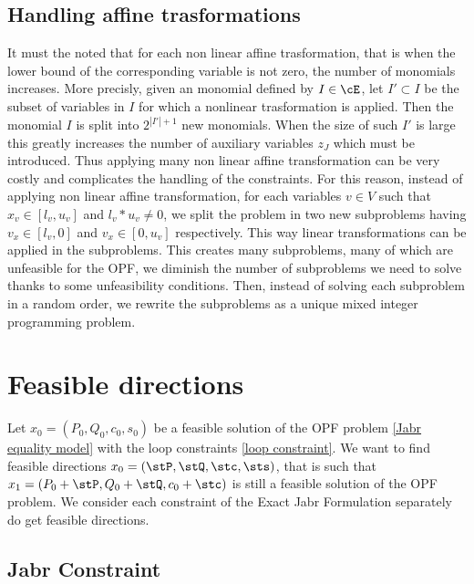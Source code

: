 \documentclass{article}
\begin{document}
\subsection{Handling affine trasformations}\label{subsection:Handling affine trasformations}
It must the noted that for each non linear affine trasformation, that is when the lower bound of the corresponding variable is not zero, the number of monomials increases. More precisly, given an monomial defined by \(I \in \cE\), let \(I' \subset I\) be the subset of variables in \(I\) for which a nonlinear trasformation is applied. Then the monomial \(I\) is split into \(2^{|I'| +1}\) new monomials. When the size of such \(I'\) is large this greatly increases the number of auxiliary variables \(z_J\) which must be introduced.
Thus applying many non linear affine transformation can be very costly and complicates the handling of the constraints. For this reason, instead of applying non linear affine transformation, for each variables \(v \in V\) such that \(x_v \in [l_v,u_v]\) and \(l_v*u_v \neq  0 \), we split the problem in two new subproblems having \( v_x \in [l_v, 0]\) and \(v_x \in [0, u_v]\) respectively. This way linear transformations can be applied in the subproblems. This creates many subproblems, many of which are unfeasible for the OPF, we diminish the number of subproblems we need to solve thanks to some unfeasibility conditions. Then, instead of solving each subproblem in a random order, we rewrite the subproblems as a unique mixed integer programming problem.








\section{Feasible directions}

Let \(x_0 = (P_0,Q_0,c_0,s_0)\) be a feasible solution of the OPF problem \eqref{Jabr equality model} with the loop constraints \eqref{loop constraint}.
We want to find feasible directions \(x_0 = (\stP,\stQ,\stc,\sts)\), that is such that \(x_1 = (P_0+\stP,Q_0+\stQ,c_0+\stc)\) is still a feasible solution of the OPF problem.
We consider each constraint of the Exact Jabr Formulation separately do get feasible directions.

\subsection{Jabr Constraint}
\end{document}
